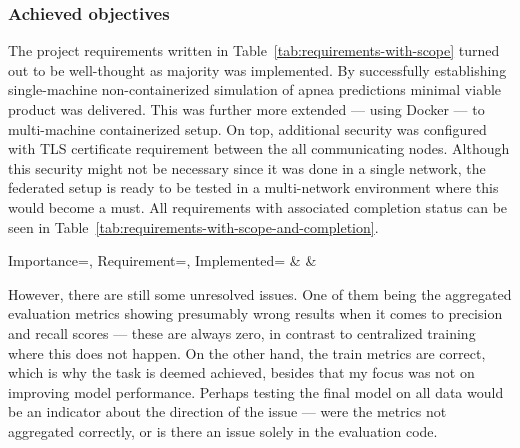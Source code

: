 \subsubsection{Achieved objectives}


The project requirements written in Table~\ref{tab:requirements-with-scope} turned out to be well-thought as majority was implemented. By successfully establishing single-machine non-containerized simulation of apnea predictions minimal viable product was delivered. This was further more extended --- using Docker --- to multi-machine containerized setup. On top, additional security was configured with TLS certificate requirement between the all communicating nodes. Although this security might not be necessary since it was done in a single network, the federated setup is ready to be tested in a multi-network environment where this would become a must. All requirements with associated completion status can be seen in Table~\ref{tab:requirements-with-scope-and-completion}.

\begin{table}[htb]\centering
    \caption{Functional requirements with their importance and completion status, higher rows correspond to higher priority. For a further dissection of minimal viable requirements, see Appendix~\ref{appendix:backlog}}\label{tab:requirements-with-scope-and-completion}
    {Importance=\importance, Requirement=\requirement, Implemented=\implemented}{%
        \importance & \requirement & \implemented
    }
\end{table}

However, there are still some unresolved issues. One of them being the aggregated evaluation metrics showing presumably wrong results when it comes to precision and recall scores --- these are always zero, in contrast to centralized training where this does not happen. On the other hand, the train metrics are correct, which is why the task is deemed achieved, besides that my focus was not on improving model performance. Perhaps testing the final model on all data would be an indicator about the direction of the issue --- were the metrics not aggregated correctly, or is there an issue solely in the evaluation code.

